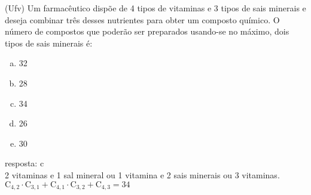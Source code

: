 \begin{ex}
 (Ufv) Um farmacêutico dispõe de 4 tipos de vitaminas e 3 tipos de sais minerais e deseja combinar três desses nutrientes para obter um composto químico. O número de compostos que poderão ser preparados usando-se no máximo, dois tipos de sais minerais é:
    \begin{enumerate}[(a)]
    \item 32
    \item 28
    \item 34
    \item 26
    \item 30
    \end{enumerate}
      \begin{sol}
       resposta: c \\
       2 vitaminas e 1 sal mineral  ou 1 vitamina e 2 sais minerais ou 3 vitaminas.  \\
       $\mathrm{C}_{4,2}\cdot\mathrm{C}_{3,1}+\mathrm{C}_{4,1}\cdot\mathrm{C}_{3,2}+\mathrm{C}_{4,3}=34$
      \end{sol}
\end{ex}